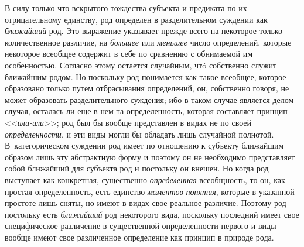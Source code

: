 В силу только что вскрытого тождества субъекта и предиката по
их отрицательному единству, род определен в разделительном суждении как
{\em ближайший} род. Это
выражение указывает прежде всего на некоторое только количественное
различие, на {\em большее} или {\em меньшее}
число определений, которые некоторое всеобщее содержит в себе
по сравнению с обнимаемой им особенностью. Согласно этому остается
случайным, чтó собственно служит ближайшим родом. Но поскольку род
понимается как такое всеобщее, которое образовано только путем отбрасывания
определений, он, собственно говоря, не может образовать разделительного
суждения; ибо в таком случае является делом случая, осталась ли еще в нем
та определенность, которая составляет принцип <<{\em или-или}>>; род был
бы вообще представлен в видах не по своей {\em определенности}, и
эти виды могли бы обладать лишь случайной полнотой. В~категорическом
суждении род имеет по отношению к субъекту ближайшим образом лишь эту
абстрактную форму и поэтому он не необходимо представляет собой ближайший
для субъекта род и постольку он внешен. Но когда род выступает как
конкретная, существенно {\em определенная}
всеобщность, то он, как простая определенность, есть единство
{\em моментов понятия},
которые в указанной простоте лишь сняты, но
имеют в видах свое реальное различие. Поэтому род постольку есть
{\em ближайший} род
некоторого вида, поскольку последний имеет свое специфическое различение в
существенной определенности первого и виды вообще имеют свое различенное
определение как принцип в природе рода.

